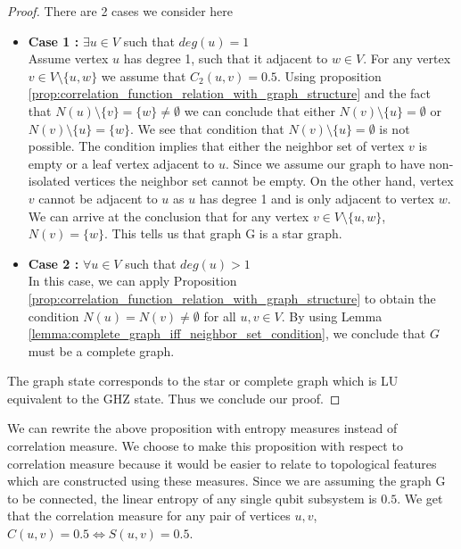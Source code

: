\documentclass{article}
\begin{document}
\begin{proof}
There are 2 cases we consider here 
\begin{itemize}
    \item \textbf{Case 1 :} $\exists u \in V$ such that $deg(u) = 1$ \\
    Assume vertex $ u $ has degree 1, such that it adjacent to $ w \in V $. For any vertex $v \in V\setminus\{u,w\}$ we assume that $C_2(u, v) = 0.5$. Using proposition \ref{prop:correlation_function_relation_with_graph_structure} and the fact that $N(u) \setminus \{v\} =\{w\} \neq \emptyset$ we can conclude that either $N(v) \setminus\{u\} = \emptyset$ or $N(v) \setminus\{u\} = \{w\}$. We see that condition that $N(v) \setminus\{u\} = \emptyset$ is not possible. The condition implies that either the neighbor set of vertex $v$ is empty or a leaf vertex adjacent to $u$. Since we assume our graph to have non-isolated vertices the neighbor set cannot be empty. On the other hand, vertex $v$ cannot be adjacent to $u$ as $u$ has degree 1 and is only adjacent to vertex $w$. We can arrive at the conclusion that for any vertex $v \in V\setminus\{u,w\}$, $N(v) = \{w\} $. This tells us that graph G is a star graph.
     \item \textbf{Case 2 :} $\forall u \in V$ such that $deg(u) > 1$ \\
In this case, we can apply Proposition \ref{prop:correlation_function_relation_with_graph_structure} to obtain the condition $ N(u) = N(v) \neq \emptyset $ for all $ u, v \in V $. By using Lemma \ref{lemma:complete_graph_iff_neighbor_set_condition}, we conclude that $ G $ must be a complete graph.
\end{itemize}
The graph state corresponds to the star or complete graph which is LU equivalent to the GHZ state. Thus we conclude our proof.
\end{proof}

We can rewrite the above proposition with entropy measures instead of correlation measure. We choose to make this proposition with respect to correlation measure because it would be easier to relate to topological features which are constructed using these measures. Since we are assuming the graph G to be connected, the linear entropy of any single qubit subsystem is $0.5$. We get that the correlation measure for any pair of vertices $u, v$, $C(u, v) = 0.5 \iff S(u, v) = 0.5$. 
\end{document}

